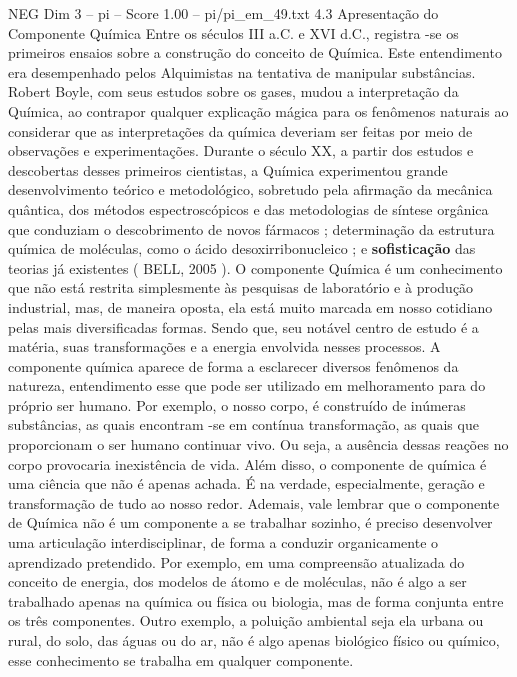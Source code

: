 \begin{textsample}{NEG Dim 3 – pi – Score 1.00 – pi/pi\_em\_49.txt}  \label{ex:f3_neg_039}
4.3 Apresentação do Componente Química Entre os séculos III a.C. e XVI d.C., registra -se os primeiros ensaios sobre a construção do conceito de Química.
Este entendimento era desempenhado pelos Alquimistas na tentativa de manipular substâncias.
Robert Boyle, com seus estudos sobre os gases, mudou a interpretação da Química, ao contrapor qualquer explicação mágica para os fenômenos naturais ao considerar que as interpretações da química deveriam ser feitas por meio de observações e experimentações.
Durante o século XX, a partir dos estudos e descobertas desses primeiros cientistas, a Química experimentou grande desenvolvimento teórico e metodológico, sobretudo pela afirmação da mecânica quântica, dos métodos espectroscópicos e das metodologias de síntese orgânica que conduziam o descobrimento de novos fármacos ; determinação da estrutura química de moléculas, como o ácido desoxirribonucleico ; e \textbf{sofisticação} das teorias já existentes ( BELL, 2005 ).
O componente Química é um conhecimento que não está restrita simplesmente às pesquisas de laboratório e à produção industrial, mas, de maneira oposta, ela está muito marcada em nosso cotidiano pelas mais diversificadas formas.
Sendo que, seu notável centro de estudo é a matéria, suas transformações e a energia envolvida nesses processos.
A componente química aparece de forma a esclarecer diversos fenômenos da natureza, entendimento esse que pode ser utilizado em melhoramento para do próprio ser humano.
Por exemplo, o nosso corpo, é construído de inúmeras substâncias, as quais encontram -se em contínua transformação, as quais que proporcionam o ser humano continuar vivo.
Ou seja, a ausência dessas reações no corpo provocaria inexistência de vida.
Além disso, o componente de química é uma ciência que não é apenas achada.
É na verdade, especialmente, geração e transformação de tudo ao nosso redor.
Ademais, vale lembrar que o componente de Química não é um componente a se trabalhar sozinho, é preciso desenvolver uma articulação interdisciplinar, de forma a conduzir organicamente o aprendizado pretendido.
Por exemplo, em uma compreensão atualizada do conceito de energia, dos modelos de átomo e de moléculas, não é algo a ser trabalhado apenas na química ou física ou biologia, mas de forma conjunta entre os três componentes.
Outro exemplo, a poluição ambiental seja ela urbana ou rural, do solo, das águas ou do ar, não é algo apenas biológico físico ou químico, esse conhecimento se trabalha em qualquer componente.

\end{textsample}
